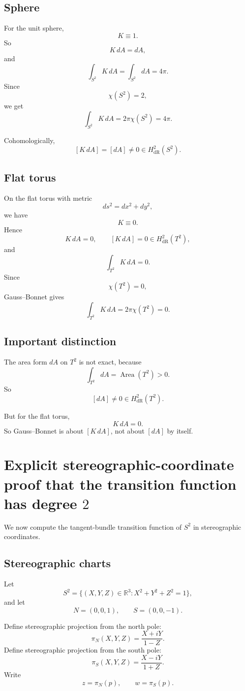 \documentclass[11pt]{article}
\begin{document}
	\subsection{Sphere}
	
	For the unit sphere,
	\[
	K\equiv 1.
	\]
	So
	\[
	K\,dA=dA,
	\]
	and
	\[
	\int_{S^2}K\,dA=\int_{S^2}dA=4\pi.
	\]
	Since
	\[
	\chi(S^2)=2,
	\]
	we get
	\[
	\int_{S^2}K\,dA=2\pi\chi(S^2)=4\pi.
	\]
	
	Cohomologically,
	\[
	[K\,dA]=[dA]\neq 0\in H^2_{\mathrm{dR}}(S^2).
	\]
	
	\subsection{Flat torus}
	
	On the flat torus with metric
	\[
	ds^2=dx^2+dy^2,
	\]
	we have
	\[
	K\equiv 0.
	\]
	Hence
	\[
	K\,dA=0,
	\qquad
	[K\,dA]=0\in H^2_{\mathrm{dR}}(T^2),
	\]
	and
	\[
	\int_{T^2}K\,dA=0.
	\]
	Since
	\[
	\chi(T^2)=0,
	\]
	Gauss--Bonnet gives
	\[
	\int_{T^2}K\,dA=2\pi\chi(T^2)=0.
	\]
	
	\subsection{Important distinction}
	
	The area form \(dA\) on \(T^2\) is not exact, because
	\[
	\int_{T^2} dA = \operatorname{Area}(T^2)>0.
	\]
	So
	\[
	[dA]\neq 0\in H^2_{\mathrm{dR}}(T^2).
	\]
	
	But for the flat torus,
	\[
	K\,dA=0.
	\]
	So Gauss--Bonnet is about \([K\,dA]\), not about \([dA]\) by itself.
	
	\section{Explicit stereographic-coordinate proof that the transition function has degree \(2\)}
	
	We now compute the tangent-bundle transition function of \(S^2\) in stereographic coordinates.
	
	\subsection{Stereographic charts}
	
	Let
	\[
	S^2=\{(X,Y,Z)\in\mathbb{R}^3:X^2+Y^2+Z^2=1\},
	\]
	and let
	\[
	N=(0,0,1),\qquad S=(0,0,-1).
	\]
	
	Define stereographic projection from the north pole:
	\[
	\pi_N(X,Y,Z)=\frac{X+iY}{1-Z}.
	\]
	Define stereographic projection from the south pole:
	\[
	\pi_S(X,Y,Z)=\frac{X-iY}{1+Z}.
	\]
	Write
	\[
	z=\pi_N(p),\qquad w=\pi_S(p).
	\]
	
\end{document}
